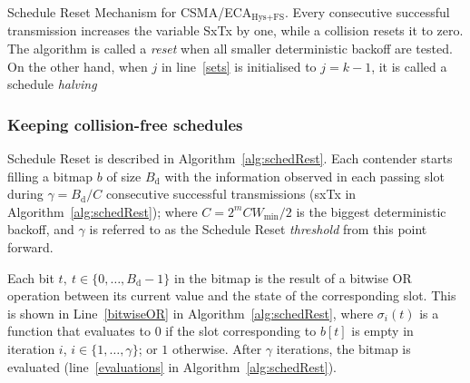		
			\begin{algorithm}[tb]
		\vspace{0.2cm}
		\caption{Schedule Reset Mechanism for CSMA/ECA$_{\text{Hys+FS}}$. Every consecutive successful transmission increases the variable SxTx by one, while a collision resets it to zero. The algorithm is called a \emph{reset} when all smaller deterministic backoff are tested. On the other hand, when $j$ in line~\ref{sets} is initialised to $j=k-1$, it is called a schedule \emph{halving}}\label{alg:schedRest}
	\end{algorithm}
		
		
		\subsubsection{Keeping collision-free schedules}
		Schedule Reset is described in Algorithm~\ref{alg:schedRest}. Each contender starts filling a bitmap $b$ of size $B_{\text{d}}$ with the information observed in each passing slot during $\gamma=B_{\text{d}}/C$ consecutive successful transmissions (sxTx in Algorithm~\ref{alg:schedRest}); where $C=2^{m}CW_{\min}/2$ is the biggest deterministic backoff, and $\gamma$ is referred to as the Schedule Reset \emph{threshold} from this point forward.
		
		Each bit $t,~t\in\{0,\ldots ,B_{\text{d}}-1\}$ in the bitmap is the result of a bitwise OR operation between its current value and the state of the corresponding slot. This is shown in Line~\ref{bitwiseOR} in Algorithm~\ref{alg:schedRest}, where $\sigma_{i}(t)$ is a function that evaluates to $0$ if the slot corresponding to $b[t]$ is empty in iteration $i$, $i \in\{1,\ldots,\gamma\}$; or $1$ otherwise. After $\gamma$ iterations, the bitmap is evaluated (line~\ref{evaluations} in Algorithm~\ref{alg:schedRest}).
		
